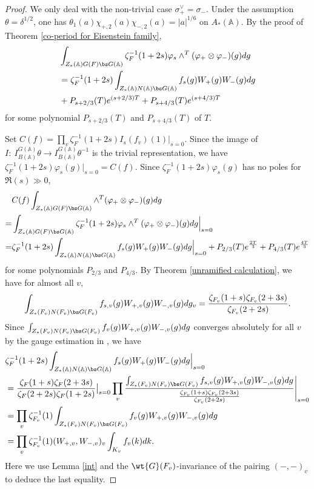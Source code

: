 \documentclass[11pt,reqno]{amsart}
\newcommand{\BA}{{\mathbb {A}}} \newcommand{\BB}{{\mathbb {B}}}
\theoremstyle{plain}
\theoremstyle{remark} \newtheorem{remark}[thm]{Remark}
\theoremstyle{definition} \newtheorem{exercise}[thm]{Exercise}
\theoremstyle{definition} \newtheorem{example}[thm]{Example} \newtheorem{condition}[thm]{Condition}
\numberwithin{equation}{section}
\renewcommand{\-}{\text{--}}
\begin{document}
\begin{proof}We only deal with the non-trivial case $\sigma_+^\vee=\sigma_-$. Under the assumption $\theta=\delta^{1/2}$, one has $\theta_1(a)\chi_{+,2}(a)\chi_{-,2}(a)=|a|^{1/6}$ on $A_*(\BA)$. By the proof of  Theorem \ref{co-period for Eisenstein family},
\begin{align*}&\int_{Z_*(\BA)G(F)\bs G(\BA)}\zeta_F^{-1}(1+2s)\varphi_s\wedge^T(\varphi_+\otimes\varphi_-)(g)dg\\
&=\zeta_F^{-1}(1+2s)\int_{Z_*(\BA)N(\BA)\bs G(\BA)}f_s(g)W_+(g)W_-(g)dg\\
&+P_{s+2/3}(T)e^{(s+2/3)T}+P_{s+4/3}(T)e^{(s+4/3)T}
\end{align*}
for some polynomial $P_{s+2/3}(T)$ and $P_{s+4/3}(T)$ of $T$.

Set $C(f)=\prod_v \zeta_F^{-1}(1+2s)I_s(f_v)(1)|_{s=0}$. Since the image of $I:\ I_{B(\BA)}^{G(\BA)}\theta\to I_{B(\BA)}^{G(\BA)}\theta^{-1}$ is the trivial representation, we have $\zeta_F^{-1}(1+2s)\varphi_s(g)|_{s=0}=C(f)$. Since  $\zeta_F^{-1}(1+2s)\varphi_s(g)$ has no poles for $\Re(s)\gg0$, \begin{align*}
&C(f)\int_{Z_*(\BA)G(F)\bs G(\BA)}\wedge^T(\varphi_+\otimes\varphi_-)(g)dg\\
=&\int_{Z_*(\BA)G(F)\bs G(\BA)}\zeta_F^{-1}(1+2s)\varphi_s\wedge^T(\varphi_+\otimes\varphi_-)(g)dg\Big|_{s=0}\\
=&\zeta_F^{-1}(1+2s)\int_{Z_*(\BA)N(\BA)\bs G(\BA)}f_s(g)W_+(g)W_-(g)dg\Big|_{s=0}+P_{2/3}(T)e^{\frac{2T}{3}}+P_{4/3}(T)e^{\frac{4T}{3}}
\end{align*}
for some polynomials $P_{2/3}$ and $P_{4/3}$. By Theorem \ref{unramified calculation}, we have for almost all $v$,
  \[\int_{Z_*(F_v)N(F_v)\bs G(F_v)}f_{s,v}(g)W_{+,v}(g)W_{-,v}(g)dg_v=\frac{\zeta_{F_v}(1+s)\zeta_{F_v}(2+3s)}{\zeta_{F_v}(2+2s)}.\]
Since  $\int_{Z_*(F_v)N(F_v)\bs G(F_v)}f_v(g)W_{+,v}(g)W_{-,v}(g)dg$ converges absolutely for all $v$ by the gauge estimation in \cite[Theorem I.4.1]{KP84}, we have 
 \begin{align*} &\zeta_F^{-1}(1+2s)\int_{Z_*(\BA)N(\BA)\bs G(\BA)}f_s(g)W_+(g)W_-(g)dg\Big|_{s=0}\\
 &=\frac{\zeta_{F}(1+s)\zeta_{F}(2+3s)}{\zeta_{F}(2+2s)\zeta_F(1+2s)}\big|_{s=0} \prod_{v}\frac{\int_{Z_*(F_v)N(F_v)\bs G(F_v)}f_{s,v}(g)W_{+,v}(g)W_{-,v}(g)dg}{\frac{\zeta_{F_v}(1+s)\zeta_{F_v}(2+3s)}{\zeta_{F_v}(2+2s)}}\Bigg|_{s=0}\\
&= \prod_{v}\zeta_{F_v}^{-1}(1)\int_{Z_*(F_v)N(F_v)\bs G(F_v)}f_v(g)W_{+,v}(g)W_{-,v}(g)dg\\
&= \prod_v\zeta_{F_v}^{-1}(1)(W_{+,v}, W_{-,v})_v\int_{K_v}f_v(k)dk.
 \end{align*}
 Here we use Lemma \ref{int} and the $\wt{G}(F_v)$-invariance of the pairing
 $(-, -)_v$ to deduce the last equality.
 

\end{proof}
\end{document}
